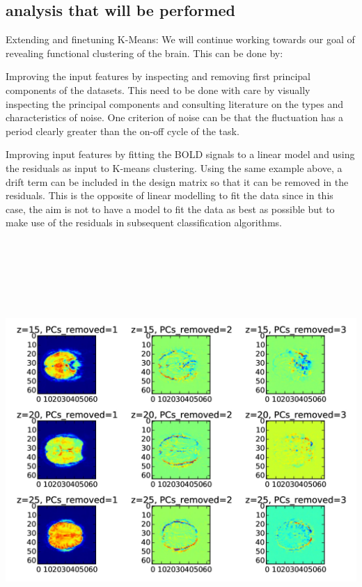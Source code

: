 \documentclass[11pt]{article}
\begin{document}
\subsection{analysis that will be performed}

Extending and finetuning K-Means: We will continue working towards our goal of
revealing functional clustering of the brain. This can be done by:
 
Improving the input features by inspecting and removing first principal
components of the datasets. This need to be done with care by visually
inspecting the principal components and consulting literature on the types and
characteristics of noise. One criterion of noise can be that the fluctuation has
a period clearly greater than the on-off cycle of the task. 

Improving input features by fitting the BOLD signals to a linear model and using
the residuals as input to K-means clustering. Using the same example above, a
drift term can be included in the design matrix so that it can be removed in the
residuals. This is the opposite of linear modelling to fit the data since in
this case, the aim is not to have a model to fit the data as best as possible
but to make use of the residuals in subsequent classification algorithms.

\includegraphics[width=16cm, height=16cm]{first_pcs_removed.jpg}
\end{document}
